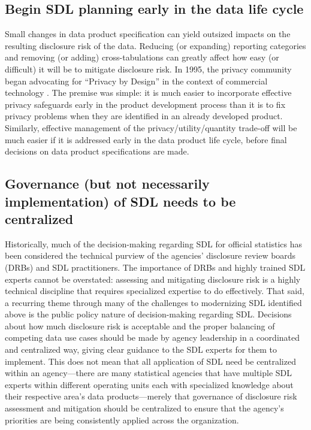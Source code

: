 \subsection{Begin SDL planning early in the data life cycle}
Small changes in data product specification can yield outsized impacts on the resulting disclosure risk of the data. Reducing (or expanding) reporting categories and removing (or adding) cross-tabulations can greatly affect how easy (or difficult) it will be to mitigate disclosure risk. In 1995, the privacy community began advocating for ``Privacy by Design'' in the context of commercial technology \cite{cavoukian:privacy:2010}. The premise was simple: it is much easier to incorporate effective privacy safeguards early in the product development process than it is to fix privacy problems when they are identified in an already developed product. Similarly, effective management of the privacy/utility/quantity trade-off will be much easier if it is addressed early in the data product life cycle, before final decisions on data product specifications are made.

\subsection{Governance (but not necessarily implementation) of SDL needs to be centralized}
Historically, much of the decision-making regarding SDL for official statistics has been considered the technical purview of the agencies' disclosure review boards (DRBs) and SDL practitioners. The importance of DRBs and highly trained SDL experts cannot be overstated: assessing and mitigating disclosure risk is a highly technical discipline that requires specialized expertise to do effectively. That said, a recurring theme through many of the challenges to modernizing SDL identified above is the public policy nature of decision-making regarding SDL. Decisions about how much disclosure risk is acceptable and the proper balancing of competing data use cases should be made by agency leadership in a coordinated and centralized way, giving clear guidance to the SDL experts for them to implement. This does not mean that all application of SDL need be centralized within an agency---there are many statistical agencies that have multiple SDL experts within different operating units each with specialized knowledge about their respective area's data products---merely that governance of disclosure risk assessment and mitigation should be centralized to ensure that the agency's priorities are being consistently applied across the organization.    

